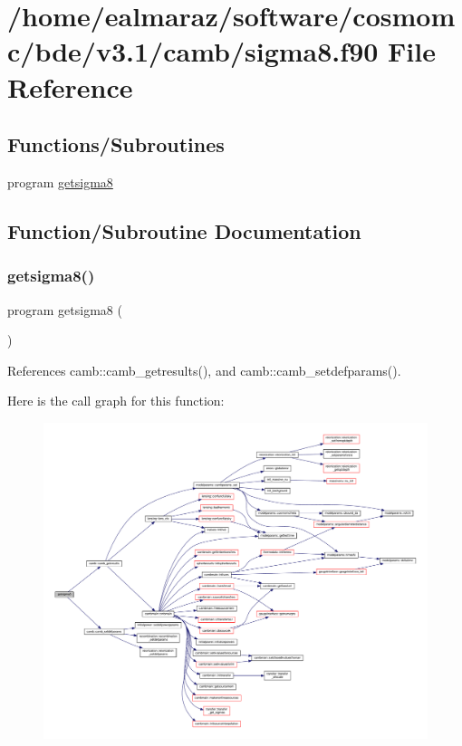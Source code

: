 \hypertarget{sigma8_8f90}{}\section{/home/ealmaraz/software/cosmomc/bde/v3.1/camb/sigma8.f90 File Reference}
\label{sigma8_8f90}
\subsection*{Functions/\+Subroutines}
\begin{DoxyCompactItemize}
\item 
program \mbox{\hyperlink{sigma8_8f90_a6f015dab88d5e09a9b144633d51f8911}{getsigma8}}
\end{DoxyCompactItemize}


\subsection{Function/\+Subroutine Documentation}
\mbox{\label{sigma8_8f90_a6f015dab88d5e09a9b144633d51f8911}} 
\subsubsection{\texorpdfstring{getsigma8()}{getsigma8()}}
{\footnotesize\ttfamily program getsigma8 (\begin{DoxyParamCaption}{ }\end{DoxyParamCaption})}



References camb\+::camb\+\_\+getresults(), and camb\+::camb\+\_\+setdefparams().

Here is the call graph for this function\+:
\nopagebreak
\begin{figure}[H]
\begin{center}
\leavevmode
\includegraphics[width=350pt]{sigma8_8f90_a6f015dab88d5e09a9b144633d51f8911_cgraph}
\end{center}
\end{figure}
